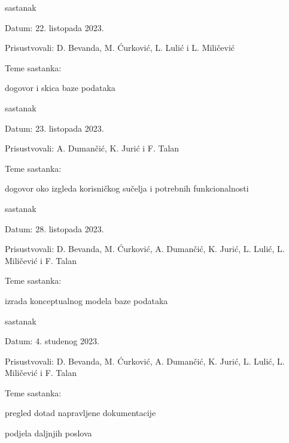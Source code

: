 \begin{packed_enum}
            \item  sastanak
			\item[] \begin{packed_item}
				\item Datum: 22. listopada 2023.
				\item Prisustvovali: D. Bevanda, M. Ćurković, L. Lulić i L. Miličević 
				\item Teme sastanka:
				\begin{packed_item}
					\item  dogovor i skica baze podataka
				\end{packed_item}
			\end{packed_item}

            \item  sastanak
			\item[] \begin{packed_item}
				\item Datum: 23. listopada 2023.
				\item Prisustvovali: A. Dumančić, K. Jurić i F. Talan
				\item Teme sastanka:
				\begin{packed_item}
					\item  dogovor oko izgleda korisničkog sučelja i potrebnih funkcionalnosti
				\end{packed_item}
			\end{packed_item}

            \item  sastanak
			\item[] \begin{packed_item}
				\item Datum: 28. listopada 2023.
				\item Prisustvovali: D. Bevanda, M. Ćurković, A. Dumančić, K. Jurić, L. Lulić, L. Miličević i F. Talan
				\item Teme sastanka:
				\begin{packed_item}
					\item  izrada konceptualnog modela baze podataka
				\end{packed_item}
			\end{packed_item}

			\item  sastanak
			\item[] \begin{packed_item}
				\item Datum: 4. studenog 2023.
				\item Prisustvovali: D. Bevanda, M. Ćurković, A. Dumančić, K. Jurić, L. Lulić, L. Miličević i F. Talan
				\item Teme sastanka:
				\begin{packed_item}
					\item  pregled dotad napravljene dokumentacije
                    \item  podjela daljnjih poslova
				\end{packed_item}
			\end{packed_item}
			
			
		\end{packed_enum}
		
